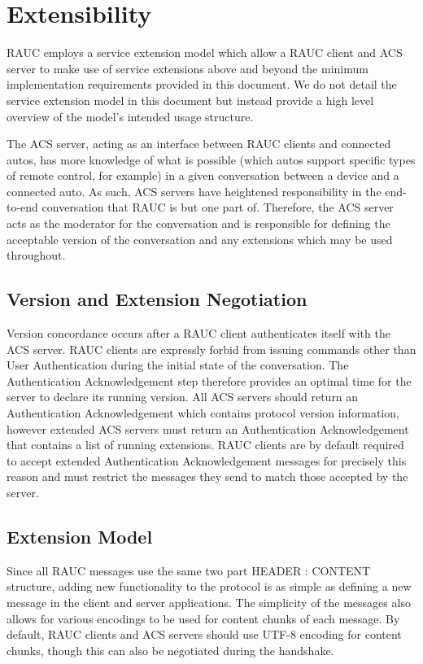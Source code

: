 
\section{Extensibility}
\label{sec:ext}
RAUC employs a service extension model which allow a RAUC client and ACS server to make use of service extensions above and beyond the minimum implementation requirements provided in this document. We do not detail the service extension model in this document but instead provide a high level overview of the model's intended usage structure.

The ACS server, acting as an interface between RAUC clients and connected autos,  has more knowledge of what is possible (which autos support specific types of remote control, for example) in a given conversation between a device and a connected auto. As such, ACS servers have heightened responsibility in the end-to-end conversation that RAUC is but one part of. Therefore, the ACS server acts as the moderator for the conversation and is responsible for defining the acceptable version of the conversation and any extensions which may be used throughout.

\subsection{Version and Extension Negotiation}
Version concordance occurs after a RAUC client authenticates itself with the ACS server. RAUC clients are expressly forbid from issuing commands other than User Authentication during the initial state of the conversation. The Authentication Acknowledgement step therefore provides an optimal time for the server to declare its running version. All ACS servers should return an Authentication Acknowledgement which contains protocol version information, however extended ACS servers must return an Authentication Acknowledgement that contains a list of running extensions. RAUC clients are by default required to accept extended Authentication Acknowledgement messages for precisely this reason and must restrict the messages they send to match those accepted by the server.

\subsection{Extension Model}

Since all RAUC messages use the same two part HEADER : CONTENT structure, adding new functionality to the protocol is as simple as defining a new message in the client and server applications. The simplicity of the messages also allows for various encodings to be used for content chunks of each message. By default, RAUC clients and ACS servers should use UTF-8 encoding for content chunks, though this can also be negotiated during the handshake.


